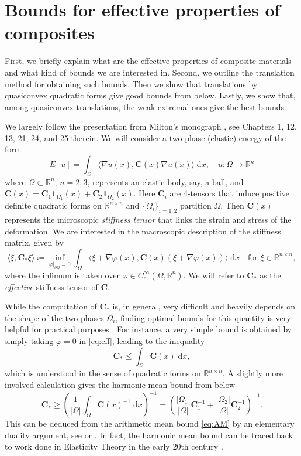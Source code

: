 \documentclass[a4paper]{article}
\numberwithin{equation}{section}
\newcommand{\R}{\mathbb{R}}
\newcommand{\dif}{\mathrm{\;d}}
\theoremstyle{definition}
\theoremstyle{remark}
\newcommand{\CC}{\mathbf{C}}
\begin{document}
\appendix

\section{Bounds for effective properties of composites}\label{sec:composites}

First, we briefly explain what are the effective properties of composite materials and what kind of bounds  we are interested in. Second, we outline the translation method for obtaining such bounds. Then we show that translations by quasiconvex quadratic forms give good bounds from below. Lastly, we show that, among quasiconvex translations, the weak extremal ones give the best bounds.

We largely follow the presentation from Milton's monograph \cite{MiltonBook}, see Chapters 1, 12, 13, 21, 24, and 25 therein. We will consider a two-phase (elastic) energy of the form 
 $$
    E[u]=\int_{\Omega} \langle \nabla u(x),\CC(x)\nabla u(x)\rangle \dif x,\quad u\colon\Omega\rightarrow\R^n
    $$
    where $\Omega\subset\R^n$, $n=2,3$, represents an elastic body, say, a ball, and
    $\CC(x)=\CC_1\mathbf{1}_{\Omega_1}(x)+\CC_2\mathbf{1}_{\Omega_2}(x)$. Here $\CC_i$ are 4-tensors that induce positive definite quadratic forms on $\R^{n\times n}$ and $\{\Omega_i\}_{i=1,2}$ partition $\Omega$. Then $\CC(x)$ represents the microscopic \emph{stiffness tensor} that links the strain and stress of the deformation. 
    We are interested in the macroscopic description of the stiffness matrix, given by
    \begin{equation}\label{eq:eff}
      \langle \xi,\CC_*\xi \rangle\coloneqq \inf_{\varphi|_{\partial\Omega}=0} \int_{\Omega} \langle \xi+\nabla\varphi(x),\CC(x) (\xi+\nabla \varphi(x)) \rangle\dif x \quad \text{for }\xi\in\R^{n\times n},
    \end{equation}
    where the infimum is taken over $\varphi\in C_c^\infty(\Omega,\R^n)$. We will refer to $\CC_*$ as the \emph{effective} stiffness tensor of $\CC$.

While the computation of $\CC_*$ is, in general, very difficult and heavily depends on the shape of the two phases $\Omega_i$, finding optimal bounds for this quantity is very helpful for practical purposes \cite[Ch. 21]{MiltonBook}. For instance, a very simple bound is obtained by simply taking $\varphi=0$ in \eqref{eq:eff}, leading to the inequality
\begin{equation}\label{eq:AM}
\CC_*\leq \int_{\Omega} \CC(x)\dif x,
\end{equation}
which is understood in the sense of quadratic forms on $\R^{n\times n}$. A slightly more involved calculation gives the harmonic mean bound from below
\begin{equation}\label{eq:HM}
    \CC_*\geq \left(\frac{1}{|\Omega|}\int_{\Omega}\CC(x)^{-1}\dif x\right)^{-1}=\left(\frac{|\Omega_1|}{|\Omega|}\CC_1^{-1}+\frac{|\Omega_2|}{|\Omega|}\CC_2^{-1}\right)^{-1}.
\end{equation}
This can be deduced from the arithmetic mean bound \eqref{eq:AM} by an elementary duality argument, see \cite[Ch. 13.1]{MiltonBook} or \cite{MiltonCPAM}. In fact, the harmonic mean bound can be traced back to work done in Elasticity Theory in the early 20th century \cite{Reuss,Voigt}.
\end{document}
